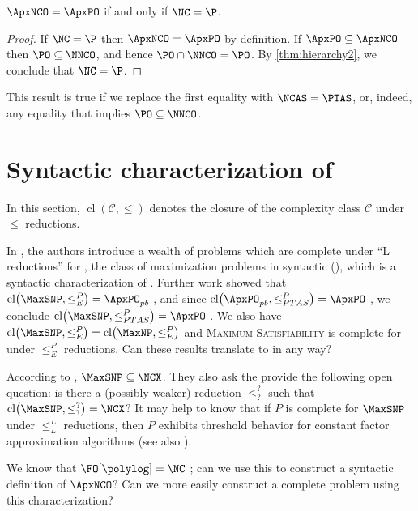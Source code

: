 \documentclass[]{article}
\newcommand{\cl}{\operatorname{cl}}
\let\originalleft\left
\let\originalright\right
\renewcommand{\left}{\mathopen{}\mathclose\bgroup\originalleft}
\renewcommand{\right}{\aftergroup\egroup\originalright}
\begin{document}
\begin{corollary}
  $\ApxNCO = \ApxPO$ if and only if $\NC = \P$.
\end{corollary}
\begin{proof}
  If $\NC = \P$ then $\ApxNCO = \ApxPO$ by definition.
  If $\ApxPO \subseteq \ApxNCO$ then $\PO \subseteq \NNCO$, and hence $\PO \cap \NNCO = \PO$.
  By \autoref{thm:hierarchy2}, we conclude that $\NC = \P$.
\end{proof}

This result is true if we replace the first equality with $\NCAS = \PTAS$, or, indeed, any equality that implies $\PO \subseteq \NNCO$.

\section{Syntactic characterization of \texorpdfstring{\ApxNCO}{ApxNCO}}

In this section, $\cl(\mathcal{C}, \leq)$ denotes the closure of the complexity class $\mathcal{C}$ under $\leq$ reductions.

In \cite{py91}, the authors introduce a wealth of problems which are complete under ``L reductions'' for \MaxSNP, the class of maximization problems in syntactic \NP{} (\SNP), which is a syntactic characterization of \NP.
Further work showed that $\cl\left(\MaxSNP, \leq^P_E\right) = \ApxPO_{pb}$ \cite[Theorem~1]{kmsv99}, and since $\cl\left(\ApxPO_{pb}, \leq^P_{PTAS}\right) = \ApxPO$ \cite{ct00}, we conclude $\cl\left(\MaxSNP, \leq^P_{PTAS}\right) = \ApxPO$ \cite{kmsv99}.
We also have $\cl\left(\MaxSNP, \leq^P_E\right) = \cl\left(\MaxNP, \leq^P_E\right)$ \cite[Theorem~2]{kmsv99} and \textsc{Maximum Satisfiability} is complete for \MaxNP{} under $\leq^P_E$ reductions.
Can these results translate to \NC{} in any way?

According to \cite[Theorem~9.1.3]{dsst97}, $\MaxSNP \subseteq \NCX$.
They also ask the provide the following open question: is there a (possibly weaker) reduction $\leq^?_?$ such that $\cl\left(\MaxSNP, \leq^?_?\right) = \NCX$?
It may help to know that if $P$ is complete for $\MaxSNP$ under $\leq^L_L$ reductions, then $P$ exhibits threshold behavior for constant factor \NC{} approximation algorithms \cite[Theorem~9]{sx95} (see also \cite[Theorem~9.2.3]{dsst97}).

\begin{todo}
  We know that $\FO[\polylog] = \NC$ \cite[Theorem~5.2]{immerman99}; can we use this to construct a syntactic definition of $\ApxNCO$?
  Can we more easily construct a complete problem using this characterization?
\end{todo}
\end{document}
